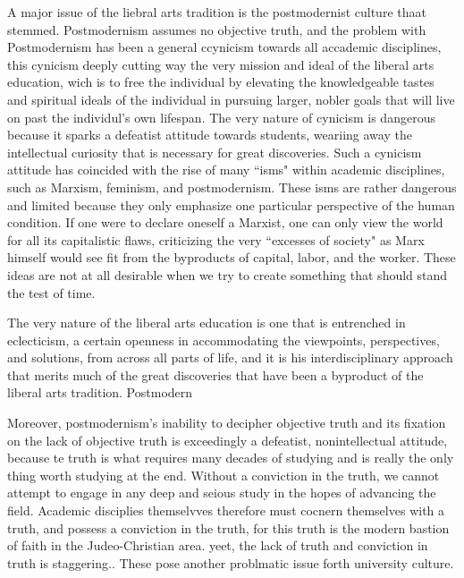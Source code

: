 \documentclass[12pt,letterpaper]{article}
\begin{document}
A major issue of the liebral arts tradition is the postmodernist culture thaat stemmed.  Postmodernism assumes no objective truth, and the problem with Postmodernism has been a general ccynicism towards all accademic disciplines, this cynicism deeply cutting way the very mission and ideal of the liberal arts education, wich is to free the individual by elevating the knowledgeable tastes and spiritual ideals of the individual in pursuing larger, nobler goals that will live on past the individul's own lifespan.  The very nature of cynicism is dangerous because it sparks a defeatist attitude towards students, weariing away the intellectual curiosity that is necessary for great discoveries.  Such a cynicism attitude has coincided with the rise of many ``isms" within academic disciplines, such as Marxism, feminism, and postmodernism.  These isms are rather dangerous and limited because they only emphasize one particular perspective of the human condition. If one were to declare oneself a Marxist, one can only view the world for all its capitalistic flaws, criticizing the very ``excesses of society" as Marx himself would see fit from the byproducts of capital, labor, and the worker.  These ideas are not at all desirable when we try to create something that should stand the test of time. 

The very nature of the liberal arts education is one that is entrenched in eclecticism, a certain openness in accommodating the viewpoints, perspectives, and solutions, from across all parts of life, and it is his interdisciplinary approach that merits much of the great discoveries that have been a byproduct of the liberal arts tradition.    Postmodern

Moreover, postmodernism's inability to decipher objective truth and its fixation on the lack of objective truth is exceedingly a defeatist, nonintellectual attitude, because te truth is what requires many decades of studying and is really the only thing worth studying at the end.  Without a conviction in the truth, we cannot attempt to engage in any deep and seious study in the hopes of advancing the field.  Academic disciplies themselvves therefore must cocnern themselves with a truth, and possess a conviction in the truth, for this truth is the modern bastion of faith in the Judeo-Christian area.  yeet, the lack of truth and conviction in truth is staggering..  These pose another problmatic issue forth university culture.
\end{document}
